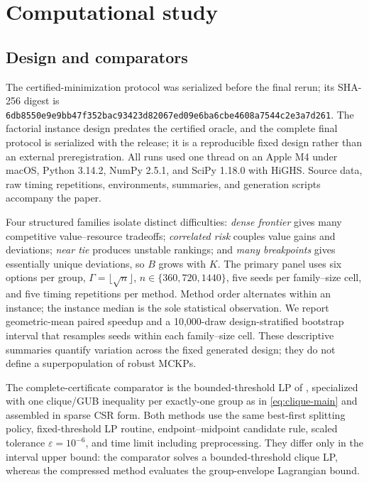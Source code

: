\documentclass[11pt]{article}
\theoremstyle{plain}
\theoremstyle{definition}
\theoremstyle{remark}
\begin{document}
\section{Computational study}\label{sec:computations}

\subsection{Design and comparators}

The certified-minimization protocol was serialized before the final rerun; its SHA-256 digest is
\nolinkurl{6db8550e9e9bb47f352bac93423d82067ed09e6ba6cbe4608a7544c2e3a7d261}.
The factorial instance design predates the certified oracle, and the complete final protocol is serialized with the release; it is a reproducible fixed design rather than an external preregistration.  All runs used one thread on an Apple M4 under macOS, Python 3.14.2, NumPy 2.5.1, and SciPy 1.18.0 with HiGHS.  Source data, raw timing repetitions, environments, summaries, and generation scripts accompany the paper.

Four structured families isolate distinct difficulties: \emph{dense frontier} gives many competitive value--resource tradeoffs; \emph{correlated risk} couples value gains and deviations; \emph{near tie} produces unstable rankings; and \emph{many breakpoints} gives essentially unique deviations, so $B$ grows with $K$.  The primary panel uses six options per group, $\Gamma=\lfloor\sqrt n\rfloor$, $n\in\{360,720,1440\}$, five seeds per family--size cell, and five timing repetitions per method.  Method order alternates within an instance; the instance median is the sole statistical observation.  We report geometric-mean paired speedup and a 10,000-draw design-stratified bootstrap interval that resamples seeds within each family--size cell.  These descriptive summaries quantify variation across the fixed generated design; they do not define a superpopulation of robust MCKPs.

The complete-certificate comparator is the bounded-threshold LP of \citet{BusingGersingKoster2023}, specialized with one clique/GUB inequality per exactly-one group as in \eqref{eq:clique-main} and assembled in sparse CSR form.  Both methods use the same best-first splitting policy, fixed-threshold LP routine, endpoint--midpoint candidate rule, scaled tolerance $\varepsilon=10^{-6}$, and time limit including preprocessing.  They differ only in the interval upper bound: the comparator solves a bounded-threshold clique LP, whereas the compressed method evaluates the group-envelope Lagrangian bound.
\end{document}
